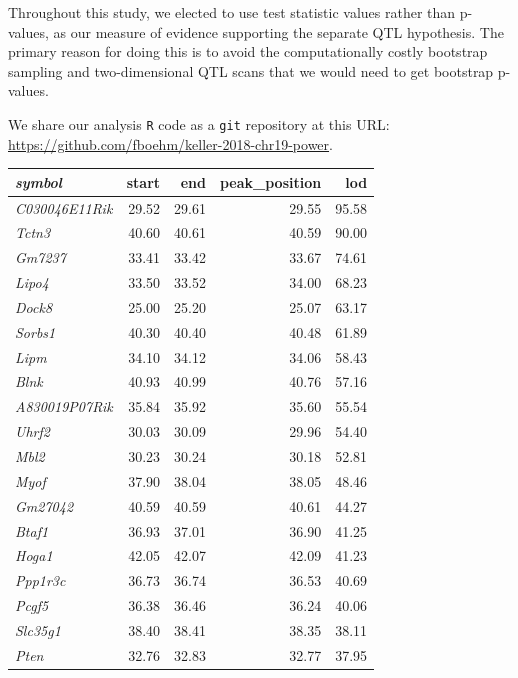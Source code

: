 \documentclass{article}
\begin{document}
Throughout this study, we elected to use test statistic values rather than p-values, as our measure of evidence supporting the separate QTL hypothesis. The primary reason for doing this is to avoid the computationally costly bootstrap sampling and two-dimensional QTL scans that we would need to get bootstrap p-values.

We share our analysis \texttt{R} code \citep{r} as a \texttt{git} repository at this URL: \url{https://github.com/fboehm/keller-2018-chr19-power}.



\printbibliography


\begin{table}[ht]
\centering
\begingroup\tiny
\begin{tabular}{>{\em}lrrrr}
  \hline
symbol & start & end & peak\_position & lod \\ 
  \hline
C030046E11Rik & 29.52 & 29.61 & 29.55 & 95.58 \\ 
  Tctn3 & 40.60 & 40.61 & 40.59 & 90.00 \\ 
  Gm7237 & 33.41 & 33.42 & 33.67 & 74.61 \\ 
  Lipo4 & 33.50 & 33.52 & 34.00 & 68.23 \\ 
  Dock8 & 25.00 & 25.20 & 25.07 & 63.17 \\ 
  Sorbs1 & 40.30 & 40.40 & 40.48 & 61.89 \\ 
  Lipm & 34.10 & 34.12 & 34.06 & 58.43 \\ 
  Blnk & 40.93 & 40.99 & 40.76 & 57.16 \\ 
  A830019P07Rik & 35.84 & 35.92 & 35.60 & 55.54 \\ 
  Uhrf2 & 30.03 & 30.09 & 29.96 & 54.40 \\ 
  Mbl2 & 30.23 & 30.24 & 30.18 & 52.81 \\ 
  Myof & 37.90 & 38.04 & 38.05 & 48.46 \\ 
  Gm27042 & 40.59 & 40.59 & 40.61 & 44.27 \\ 
  Btaf1 & 36.93 & 37.01 & 36.90 & 41.25 \\ 
  Hoga1 & 42.05 & 42.07 & 42.09 & 41.23 \\ 
  Ppp1r3c & 36.73 & 36.74 & 36.53 & 40.69 \\ 
  Pcgf5 & 36.38 & 36.46 & 36.24 & 40.06 \\ 
  Slc35g1 & 38.40 & 38.41 & 38.35 & 38.11 \\ 
  Pten & 32.76 & 32.83 & 32.77 & 37.95 \\ 

\end{tabular}
\end{table}
\end{document}
